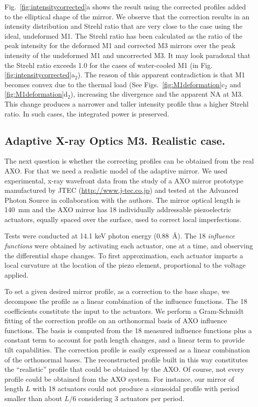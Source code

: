 \documentclass{iucr}
\begin{document}
Fig.~\ref{fig:intensitycorrected}a shows the result using the corrected profiles added to the elliptical shape of the mirror. We observe that the correction results in an intensity distribution and Strehl ratio that are very close to the case using the ideal, undeformed M1. The Strehl ratio has been calculated as the ratio of the peak intensity for the deformed M1 and corrected M3 mirrors over the peak intensity of the undeformed M1 and uncorrected M3. It may look paradoxal that the Strehl ratio exceeds 1.0 for the cases of water-cooled M1 (in Fig.\ref{fig:intensitycorrected}a$_2$). The reason of this apparent contradiction is that M1 becomes convex due to the thermal load (See Figs.~\ref{fig:M1deformation}c$_2$ and \ref{fig:M1deformation}d$_2$), increasing the divergence and the apparent NA at M3. This change produces a narrower and taller intensity profile thus a higher Strehl ratio.
In such cases, the integrated power is preserved.

\subsection{Adaptive X-ray Optics M3. Realistic case.}

The next question is whether the correcting profiles can be obtained from the real AXO. For that we need a realistic model of the adaptive mirror. We used experimental, x-ray wavefront data from the study of a AXO mirror prototype manufactured by JTEC (\url{http://www.j-tec.co.jp}) and tested at the Advanced Photon Source in collaboration with the authors. The mirror optical length is 140~mm and the AXO mirror has 18  individually addressable piezoelectric actuators, equally spaced over the surface, used to correct local imperfections.


Tests were conducted at 14.1 keV photon energy (0.88~\AA). The 18 \emph{influence functions} were obtained by activating each actuator, one at a time, and observing the differential shape changes. To first approximation, each actuator imparts a local curvature at the location of the piezo element, proportional to the voltage applied.

To set a given desired mirror profile, as a correction to the base shape, we decompose the profile as a linear combination of the influence functions. The 18 coefficients constitute the input to the actuators. We perform a Gram-Schmidt fitting of the correction profile on an orthonormal basis of AXO influence functions. The basis is computed from the 18 measured influence functions plus a constant term to account for path length changes, and a linear term to provide tilt capabilities. The correction profile is easily expressed as a linear combination of the orthonormal bases. The reconstructed profile built in this way constitutes the ``realistic'' profile that could be obtained by the AXO. Of course, not every profile could be obtained from the AXO system. For instance, our mirror of length $L$ with 18 actuators could not produce a sinusoidal profile with period smaller than about $L/6$ considering 3 actuators per period. 
\end{document}
